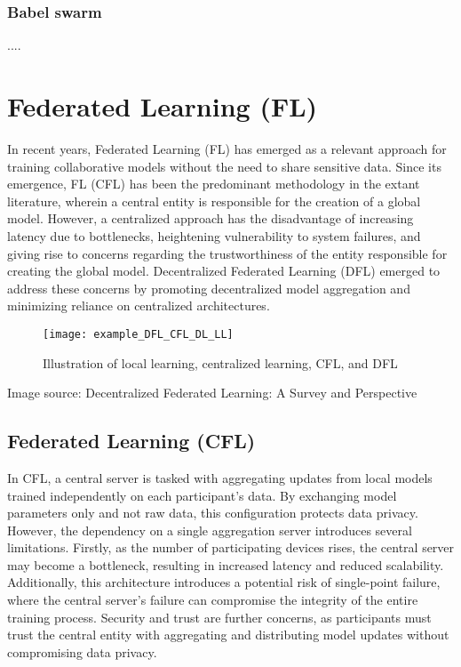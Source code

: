 \subsubsection{Babel swarm}
\label{sec:babel_swarm}

....


\section{Federated Learning (FL)}
\label{sec:federated_laerning}

In recent years, Federated Learning (FL) has emerged as a relevant approach for training collaborative models without the need to share sensitive data. Since its emergence, \gls{FL} (\gls{CFL}) has been the predominant methodology in the extant literature, wherein a central entity is responsible for the creation of a global model. However, a centralized approach has the disadvantage of increasing latency due to bottlenecks, heightening vulnerability to system failures, and giving rise to concerns regarding the trustworthiness of the entity responsible for creating the global model. Decentralized Federated Learning (DFL) emerged to address these concerns by promoting decentralized model aggregation and minimizing reliance on centralized architectures.

\begin{figure}[H]
  \centering
  \texttt{[image: example\_DFL\_CFL\_DL\_LL]}
  \caption{Illustration of local learning, centralized learning, CFL, and DFL}
  \label{fig:DFL_CFL_DL_LL}
\end{figure}

Image source: Decentralized Federated Learning: A Survey and Perspective

\subsection{Federated Learning (CFL)}
\label{sub:federated_learning}

In CFL, a central server is tasked with aggregating updates from local models trained independently on each participant’s data. By exchanging model parameters only and not raw data, this configuration protects data privacy. However, the dependency on a single aggregation server introduces several limitations. Firstly, as the number of participating devices rises, the central server may become a bottleneck, resulting in increased latency and reduced scalability. Additionally, this architecture introduces a potential risk of single-point failure, where the central server’s failure can compromise the integrity of the entire training process. Security and trust are further concerns, as participants must trust the central entity with aggregating and distributing model updates without compromising data privacy.


